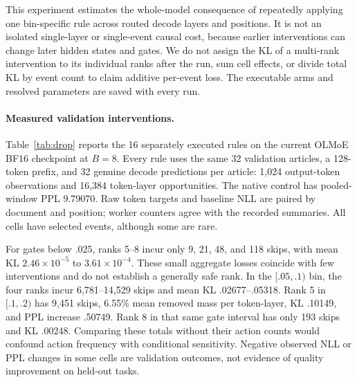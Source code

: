\documentclass[10pt,twocolumn]{article}
\begin{document}
This experiment estimates the whole-model consequence of repeatedly applying one bin-specific rule across routed decode layers and positions. It is not an isolated single-layer or single-event causal cost, because earlier interventions can change later hidden states and gates. We do not assign the KL of a multi-rank intervention to its individual ranks after the run, sum cell effects, or divide total KL by event count to claim additive per-event loss. The executable arms and resolved parameters are saved with every run.

\paragraph{Measured validation interventions.}
Table~\ref{tab:drop} reports the 16 separately executed rules on the current OLMoE BF16 checkpoint at $B=8$. Every rule uses the same 32 validation articles, a 128-token prefix, and 32 genuine decode predictions per article: 1,024 output-token observations and 16,384 token-layer opportunities. The native control has pooled-window PPL 9.79070. Raw token targets and baseline NLL are paired by document and position; worker counters agree with the recorded summaries. All cells have selected events, although some are rare.

For gates below .025, ranks 5--8 incur only 9, 21, 48, and 118 skips, with mean KL $2.46\!\times\!10^{-5}$ to $3.61\!\times\!10^{-4}$. These small aggregate losses coincide with few interventions and do not establish a generally safe rank. In the $[.05,.1)$ bin, the four ranks incur 6,781--14,529 skips and mean KL .02677--.05318. Rank 5 in $[.1,.2)$ has 9,451 skips, 6.55\% mean removed mass per token-layer, KL .10149, and PPL increase .50749. Rank 8 in that same gate interval has only 193 skips and KL .00248. Comparing these totals without their action counts would confound action frequency with conditional sensitivity. Negative observed NLL or PPL changes in some cells are validation outcomes, not evidence of quality improvement on held-out tasks.
\end{document}
